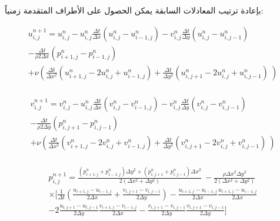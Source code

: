 بإعادة ترتيب المعادلات السابقة يمكن الحصول على الأطراف المتقدمة زمنياً:

\begin{equation}
\begin{matrix}u_{i,j}^{n+1}=u_{i,j}^n-u_{i,j}^n\frac{\Delta t}{\Delta x}(u_{i,j}^n-u_{i-1,j}^n)-v_{i,j}^n\frac{\Delta t}{\Delta y}(u_{i,j}^n-u_{i,j-1}^n)\\-\frac{\Delta t}{\rho2\Delta x}(p_{i+1,j}^n-p_{i-1,j}^n)\\+\nu\left(\frac{\Delta t}{\Delta x^2}\left(u_{i+1,j}^n-2u_{i,j}^n+u_{i-1,j}^n\right)+\frac{\Delta t}{\Delta y^2}\left(u_{i,j+1}^n-2u_{i,j}^n+u_{i,j-1}^n\right)\ \right)\\\end{matrix}
\end{equation}

\begin{equation}
\begin{matrix}v_{i,j}^{n+1}=v_{i,j}^n-u_{i,j}^n\frac{\Delta t}{\Delta x}\left(v_{i,j}^n-v_{i-1,j}^n\right)-v_{i,j}^n\frac{\Delta t}{\Delta y}\left(v_{i,j}^n-v_{i,j-1}^n\right)\ \ \\-\frac{\Delta t}{\rho2\Delta y}\left(p_{i,j+1}^n-p_{i,j-1}^n\right)\\+\nu\left(\frac{\Delta t}{\Delta x^2}\left(v_{i+1,j}^n-2v_{i,j}^n+v_{i-1,j}^n\right)+\frac{\Delta t}{\Delta y^2}\left(v_{i,j+1}^n-2v_{i,j}^n+v_{i,j-1}^n\right)\ \right)\\\end{matrix}
\end{equation}

\begin{equation}
\begin{matrix}
p_{i,j}^{n+1}=\frac{\left(p_{i+1,j}^n+p_{i-1,j}^n\right)\Delta y^2+\left(p_{i,j+1}^n+p_{i,j-1}^n\right)\Delta x^2}{2\left(\Delta x^2+\Delta y^2\right)}\ -\frac{\rho\Delta x^2\Delta y^2}{2\left(\Delta x^2+\Delta y^2\right)}
\\
\times\biggl[\frac{1}{\Delta t}\left(\frac{u_{i+1,j}-u_{i-1,j}}{2\Delta x}+\frac{v_{i,j+1}-v_{i,j-1}}{2\Delta y}\right)-\frac{u_{i+1,j}-u_{i-1,j}}{2\Delta x}\frac{u_{i+1,j}-u_{i-1,j}}{2\Delta x}\\-2\frac{u_{i,j+1}-u_{i,j-1}}{2\Delta y}\frac{v_{i+1,j}-v_{i-1,j}}{2\Delta x}-\frac{v_{i,j+1}-v_{i,j-1}}{2\Delta y}\frac{v_{i,j+1}-v_{i,j-1}}{2\Delta y}\biggr]

\end{matrix}
\end{equation}


